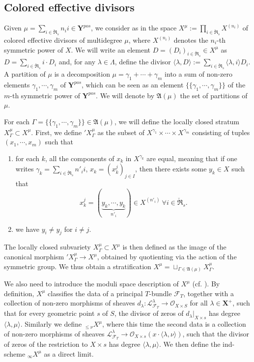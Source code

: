 \documentclass[11pt]{amsart}
\theoremstyle{plain}
\theoremstyle{remark}
\numberwithin{equation}{section}
\begin{document}
	\subsection{Colored effective divisors}\label{section colored divisor} Given $\mu=\sum_{i\in \check{\mathfrak{R}}_s}n_ii\in\mathbf{Y}^{pos}$, we consider as in \cite{finkelberg1997semiinfinite} the space $X^\mu:=\prod_{i\in \check{\mathfrak{R}}_s}X^{(n_i)}$ of colored effective divisors of multidegree $\mu$, where $X^{(n_i)}$ denotes the $n_i$-th symmetric power of $X$. We will write an element $D=(D_i)_{i\in \check{\mathfrak{R}}_s}\in X^\mu$ as $D=\sum_{i\in \check{\mathfrak{R}}_s}i\cdot D_i$ and, for any $\lambda\in\Lambda$, define the divisor $\langle\lambda,D\rangle:=\sum_{i\in \check{\mathfrak{R}}_s}\langle\lambda,i\rangle D_i$. A partition of $\mu$ is a decomposition $\mu=\gamma_1+\cdots+\gamma_m$ into a sum of non-zero elements $\gamma_1,\cdots,\gamma_m$ of $\mathbf{Y}^{pos}$, which can be seen as an element $\{\{\gamma_1,\cdots,\gamma_m\}\}$ of the $m$-th symmetric power of $\mathbf{Y}^{pos}$. We will denote by $\mathfrak{A}(\mu)$ the set of partitions of $\mu$.
	
	For each $\Gamma=\{\{\gamma_1,\cdots,\gamma_m\}\}\in \mathfrak{A}(\mu)$, we will define the locally closed stratum $X^\mu_\Gamma\subset X^\mu$. First, we define $'X^\mu_\Gamma$ as the subset of $X^{\gamma_1}\times \cdots\times X^{\gamma_m}$ consisting of tuples $(x_1,\cdots,x_m)$ such that
	\begin{enumerate}
		\item for each $k$, all the components of $x_k$ in $X^{\gamma_k}$ are equal, meaning that if one writes $\gamma_k=\sum_{i\in \check{\mathfrak{R}}_s}n'_ii$, $x_k=(x_k^j)_{j\in I}$, then there exists some $y_k\in X$ such that $$x_k^j=(\underbrace{y_k,\cdots,y_k}_{n'_i})\in X^{(n'_i)}~\forall i\in \check{\mathfrak{R}}_s.$$
		\item we have $y_i\neq y_j$ for $i\neq j$.
	\end{enumerate}
	The locally closed subvariety $X^\mu_\Gamma\subset X^\mu$ is then defined as the image of the canonical morphism ${'X^\mu_\Gamma}\to X^\mu$, obtained by quotienting via the action of the symmetric group. We thus obtain a stratification $X^\mu=\sqcup_{\Gamma\in\mathfrak{A}(\mu)}X^\mu_\Gamma$.
	
	We also need to introduce the moduli space description of $X^\mu$ (cf. \cite[§2.1]{BBGM}). By definition, $X^\mu$ classifies the data of a principal $T$-bundle $\mathcal{F}_T$, together with a collection of non-zero morphisms of sheaves
	$d_\lambda:\mathcal{L}_{\mathcal{F}_T}^\lambda\to \mathcal{O}_{X\times S}$ for all $\lambda\in \mathbf{X}^+$, such that for every geometric point $s$ of $S$, the divisor of zeros of $d_\lambda|_{X\times s}$ has degree $\langle\lambda,\mu\rangle$. Similarly we define ${_{\leq\nu} X^\mu}$, where this time the second data is a collection of  non-zero morphisms of sheaves $\mathcal{L}_{\mathcal{F}_T}^\lambda\to \mathcal{O}_{X\times s}(x\cdot\langle\lambda,\nu\rangle)$, such that the divisor of zeros of the restriction to $X\times s$ has degree $\langle\lambda,\mu\rangle$. We then define the ind-scheme $_\infty X^\mu$ as a direct limit.
	
\end{document}
